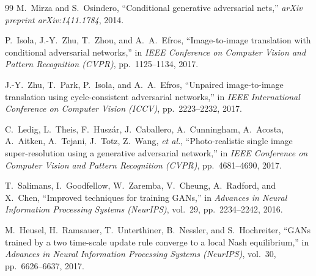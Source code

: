 \documentclass[conference]{IEEEtran}
\begin{document}
\begin{thebibliography}{99}
M.~Mirza and S.~Osindero, ``Conditional generative adversarial nets,'' \textit{arXiv preprint arXiv:1411.1784}, 2014.

P.~Isola, J.-Y.~Zhu, T.~Zhou, and A.~A.~Efros, ``Image-to-image translation with conditional adversarial networks,'' in \textit{IEEE Conference on Computer Vision and Pattern Recognition (CVPR)}, pp.~1125--1134, 2017.

J.-Y.~Zhu, T.~Park, P.~Isola, and A.~A.~Efros, ``Unpaired image-to-image translation using cycle-consistent adversarial networks,'' in \textit{IEEE International Conference on Computer Vision (ICCV)}, pp.~2223--2232, 2017.

C.~Ledig, L.~Theis, F.~Husz{\'a}r, J.~Caballero, A.~Cunningham, A.~Acosta, A.~Aitken, A.~Tejani, J.~Totz, Z.~Wang, \textit{et al.}, ``Photo-realistic single image super-resolution using a generative adversarial network,'' in \textit{IEEE Conference on Computer Vision and Pattern Recognition (CVPR)}, pp.~4681--4690, 2017.

T.~Salimans, I.~Goodfellow, W.~Zaremba, V.~Cheung, A.~Radford, and X.~Chen, ``Improved techniques for training GANs,'' in \textit{Advances in Neural Information Processing Systems (NeurIPS)}, vol.~29, pp.~2234--2242, 2016.

M.~Heusel, H.~Ramsauer, T.~Unterthiner, B.~Nessler, and S.~Hochreiter, ``GANs trained by a two time-scale update rule converge to a local Nash equilibrium,'' in \textit{Advances in Neural Information Processing Systems (NeurIPS)}, vol.~30, pp.~6626--6637, 2017.

\end{thebibliography}
\end{document}
